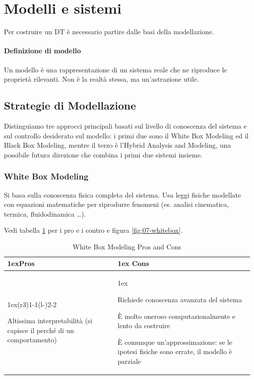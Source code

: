 %
%
\section{Modelli e sistemi}
Per costruire un DT è necessario partire dalle basi della modellazione.
%
\paragraph{Definizione di modello} Un modello è una rappresentazione di un sistema reale che ne riproduce le proprietà rilevanti. Non è la realtà stessa, ma un'astrazione utile.
%
\subsection{Strategie di Modellazione}
Distinguiamo tre approcci principali basati sul livello di conoscenza del sistema e sul controllo desiderato sul modello: i primi due sono il White Box Modeling ed il Black Box Modeling, mentre il terzo è l'Hybrid Analysis and Modeling, una possibile futura direzione che combina i primi due sistemi insieme.
%
\subsubsection{White Box Modeling}
Si basa sulla conoscenza fisica completa del sistema. Usa leggi fisiche modellate con equazioni matematiche per riprodurre fenomeni (es. analisi cinematica, termica, fluidodinamica \dots).

Vedi tabella \ref{tab:wbm} per i pro e i contro e figura \ref{fig:07-whitebox}.
%
\begin{table}
    \centering
    \begin{tabularx}{0.8\linewidth}{>{\parskip1ex}X@{\kern4\tabcolsep}>{\parskip1ex}X}
        \toprule
        \hfil\bfseries Pros
         &
        \hfil\bfseries Cons
        \\\cmidrule(r{3\tabcolsep}){1-1}\cmidrule(l{-\tabcolsep}){2-2}

        Altissima interpretabilità (si capisce il perché di un comportamento) \par

         &

        Richiede conoscenza avanzata del sistema \par
        È molto oneroso computazionalmente e lento da costruire\par
        È comunque un'approssimazione: se le ipotesi fisiche sono errate, il modello è parziale\par
        \\\bottomrule
    \end{tabularx}
    \caption{White Box Modeling Pros and Cons}\label{tab:wbm}
\end{table}

